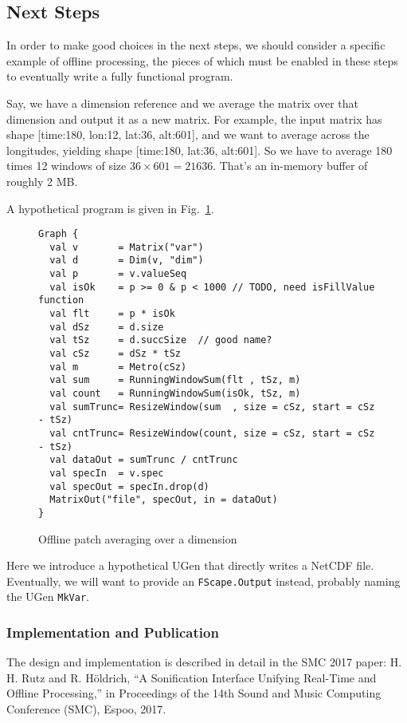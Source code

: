 \documentclass[11pt,a4paper]{article}
\newcommand{\figref}[1]{Fig.~\ref{#1}}
\begin{document}
\subsection{Next Steps}

In order to make good choices in the next steps, we should consider a specific example of offline processing, the pieces of which must be enabled in these steps to eventually write a fully functional program.

Say, we have a dimension reference and we average the matrix over that dimension and output it as a new matrix. For example, the input matrix has shape [time:180, lon:12, lat:36, alt:601], and we want to average across the longitudes, yielding shape [time:180, lat:36, alt:601]. So we have to average 180 times 12 windows of size $36 \times 601 = 21636$. That's an in-memory buffer of roughly 2 MB.

A hypothetical program is given in \figref{lst:averaging}.
%
\begin{figure}
\begin{lstlisting}[style=scala]
Graph {
  val v       = Matrix("var")
  val d       = Dim(v, "dim")
  val p       = v.valueSeq
  val isOk    = p >= 0 & p < 1000 // TODO, need isFillValue function
  val flt     = p * isOk
  val dSz     = d.size
  val tSz     = d.succSize  // good name?
  val cSz     = dSz * tSz
  val m       = Metro(cSz)
  val sum     = RunningWindowSum(flt , tSz, m)
  val count   = RunningWindowSum(isOk, tSz, m)
  val sumTrunc= ResizeWindow(sum  , size = cSz, start = cSz - tSz)
  val cntTrunc= ResizeWindow(count, size = cSz, start = cSz - tSz)
  val dataOut = sumTrunc / cntTrunc
  val specIn  = v.spec
  val specOut = specIn.drop(d)
  MatrixOut("file", specOut, in = dataOut)
}
\end{lstlisting}
\caption{Offline patch averaging over a dimension}
\label{lst:averaging}
\end{figure}

Here we introduce a hypothetical UGen that directly writes a NetCDF file. Eventually, we will want to provide an \Verb!FScape.Output! instead, probably naming the UGen \Verb!MkVar!.

\subsubsection{Implementation and Publication}

The design and implementation is described in detail in the SMC 2017 paper:
H. H. Rutz and R. Höldrich, “A Sonification Interface Unifying Real-Time and Offline Processing,” in Proceedings of the 14th Sound and Music Computing Conference (SMC), Espoo, 2017.
\end{document}
